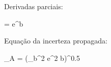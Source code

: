 
Derivadas parciais:

 = e^{b}

Equação da incerteza propagada:

\sigma_{A} = \left(\sigma_{b}^{2} e^{2 b}\right)^{0.5}
